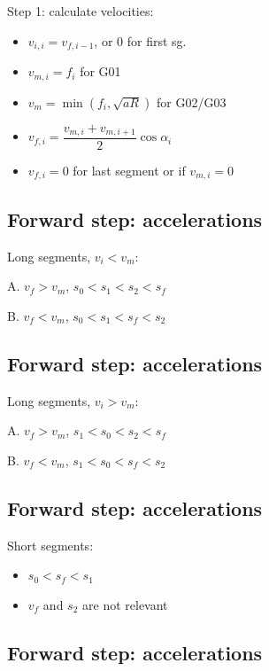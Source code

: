 \documentclass[
  letterpaper,
  DIV=11,
  numbers=noendperiod]{scrartcl}
\providecommand{\tightlist}{%
  \setlength{\itemsep}{0pt}\setlength{\parskip}{0pt}}
\begin{document}
Step 1: calculate velocities:

\begin{itemize}
\tightlist
\item
  \(v_{i,i} = v_{f,i-1}\), or 0 for first sg.
\item
  \(v_{m,i} = f_i\) for G01
\item
  \(v_m = \min(f_i, \sqrt{aR})\) for G02/G03
\item
  \(v_{f,i} = \dfrac{v_{m,i} + v_{m,i+1}}{2}\cos\alpha_i\)
\item
  \(v_{f,i} = 0\) for last segment or if \(v_{m,i} = 0\)
\end{itemize}

\subsection{Forward step:
accelerations}\label{forward-step-accelerations}

Long segments, \(v_i < v_m\):

A. \(v_f > v_m\), \(s_0 < s_1 < s_2 < s_f\)

B. \(v_f < v_m\), \(s_0 < s_1 < s_f < s_2\)

\subsection{Forward step:
accelerations}\label{forward-step-accelerations-1}

Long segments, \(v_i > v_m\):

A. \(v_f > v_m\), \(s_1 < s_0 < s_2 < s_f\)

B. \(v_f < v_m\), \(s_1 < s_0 < s_f < s_2\)

\subsection{Forward step:
accelerations}\label{forward-step-accelerations-2}

Short segments:

\begin{itemize}
\tightlist
\item
  \(s_0 < s_f < s_1\)
\item
  \(v_f\) and \(s_2\) are not relevant
\end{itemize}

\subsection{Forward step:
accelerations}\label{forward-step-accelerations-3}
\end{document}
